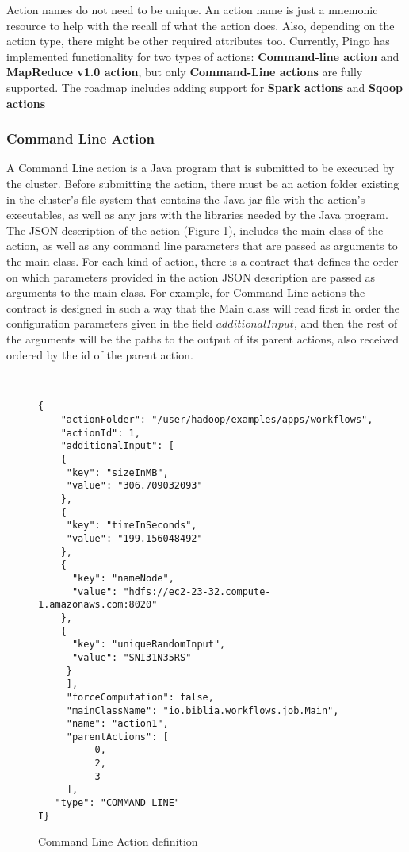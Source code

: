 Action names do not need to be unique. An action name is just a mnemonic resource to help with the recall of what the action does. Also, depending on the action type, there might be other required attributes too. Currently, Pingo has implemented functionality for two types of actions: \textbf{Command-line action} and \textbf{MapReduce v1.0 action}, but only \textbf{Command-Line actions} are fully supported. The roadmap includes adding support for \textbf{Spark actions} and \textbf{Sqoop actions}

\subsubsection{Command Line Action}
A Command Line action is a Java program that is submitted to be executed by the cluster.  Before submitting the action, there must be an action folder existing in the cluster's file system that contains the Java jar file with the action's executables, as well as any jars with the libraries needed by the Java program.  The JSON description of the action (Figure \ref{fig:command_line_action_definition}), includes the main class of the action, as well as any command line parameters that are passed as arguments to the main class. For each kind of action, there is a contract that defines the order on which parameters provided in the action JSON description are passed as arguments to the main class.  For example, for Command-Line actions the contract is designed in such a way that the Main class will read first in order the configuration parameters given in the field $additionalInput$, and then the rest of the arguments will be the paths to the output of its parent actions, also received ordered by the id of the parent action.  
\begin{figure}
\begin{mdframed}
\begin{singlespace}
\begin{verbatim}


{
    "actionFolder": "/user/hadoop/examples/apps/workflows", 
    "actionId": 1, 
    "additionalInput": [
    {
     "key": "sizeInMB",
     "value": "306.709032093"
    }, 
    {
     "key": "timeInSeconds", 
     "value": "199.156048492"
    }, 
    {
      "key": "nameNode", 
      "value": "hdfs://ec2-23-32.compute-1.amazonaws.com:8020"
    }, 
    {
      "key": "uniqueRandomInput", 
      "value": "SNI31N35RS"
     }
     ], 
     "forceComputation": false, 
     "mainClassName": "io.biblia.workflows.job.Main", 
     "name": "action1", 
     "parentActions": [
          0, 
          2, 
          3
     ], 
   "type": "COMMAND_LINE"
I}
\end{verbatim}
\end{singlespace}
\end{mdframed}
\caption{Command Line Action definition}
\label{fig:command_line_action_definition}
\end{figure}

